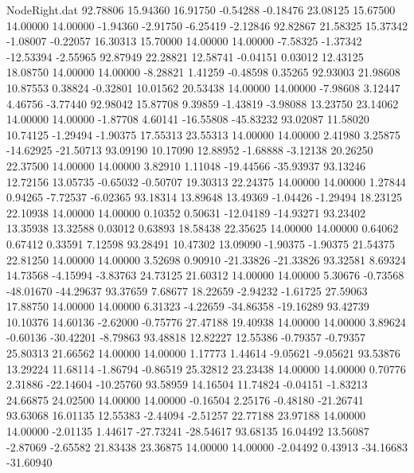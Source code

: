 \begin{filecontents}{NodeRight.dat}
  92.78806   15.94360   16.91750    -0.54288   -0.18476   23.08125   15.67500   14.00000   14.00000   -1.94360   -2.91750   -6.25419   -2.12846
  92.82867   21.58325   15.37342    -1.08007   -0.22057   16.30313   15.70000   14.00000   14.00000   -7.58325   -1.37342  -12.53394   -2.55965
  92.87949   22.28821   12.58741    -0.04151    0.03012   12.43125   18.08750   14.00000   14.00000   -8.28821    1.41259   -0.48598    0.35265
  92.93003   21.98608   10.87553     0.38824   -0.32801   10.01562   20.53438   14.00000   14.00000   -7.98608    3.12447    4.46756   -3.77440
  92.98042   15.87708    9.39859    -1.43819   -3.98088   13.23750   23.14062   14.00000   14.00000   -1.87708    4.60141  -16.55808  -45.83232
  93.02087   11.58020   10.74125    -1.29494   -1.90375   17.55313   23.55313   14.00000   14.00000    2.41980    3.25875  -14.62925  -21.50713
  93.09190   10.17090   12.88952    -1.68888   -3.12138   20.26250   22.37500   14.00000   14.00000    3.82910    1.11048  -19.44566  -35.93937
  93.13246   12.72156   13.05735    -0.65032   -0.50707   19.30313   22.24375   14.00000   14.00000    1.27844    0.94265   -7.72537   -6.02365
  93.18314   13.89648   13.49369    -1.04426   -1.29494   18.23125   22.10938   14.00000   14.00000    0.10352    0.50631  -12.04189  -14.93271
  93.23402   13.35938   13.32588     0.03012    0.63893   18.58438   22.35625   14.00000   14.00000    0.64062    0.67412    0.33591    7.12598
  93.28491   10.47302   13.09090    -1.90375   -1.90375   21.54375   22.81250   14.00000   14.00000    3.52698    0.90910  -21.33826  -21.33826
  93.32581    8.69324   14.73568    -4.15994   -3.83763   24.73125   21.60312   14.00000   14.00000    5.30676   -0.73568  -48.01670  -44.29637
  93.37659    7.68677   18.22659    -2.94232   -1.61725   27.59063   17.88750   14.00000   14.00000    6.31323   -4.22659  -34.86358  -19.16289
  93.42739   10.10376   14.60136    -2.62000   -0.75776   27.47188   19.40938   14.00000   14.00000    3.89624   -0.60136  -30.42201   -8.79863
  93.48818   12.82227   12.55386    -0.79357   -0.79357   25.80313   21.66562   14.00000   14.00000    1.17773    1.44614   -9.05621   -9.05621
  93.53876   13.29224   11.68114    -1.86794   -0.86519   25.32812   23.23438   14.00000   14.00000    0.70776    2.31886  -22.14604  -10.25760
  93.58959   14.16504   11.74824    -0.04151   -1.83213   24.66875   24.02500   14.00000   14.00000   -0.16504    2.25176   -0.48180  -21.26741
  93.63068   16.01135   12.55383    -2.44094   -2.51257   22.77188   23.97188   14.00000   14.00000   -2.01135    1.44617  -27.73241  -28.54617
  93.68135   16.04492   13.56087    -2.87069   -2.65582   21.83438   23.36875   14.00000   14.00000   -2.04492    0.43913  -34.16683  -31.60940

\end{filecontents}
